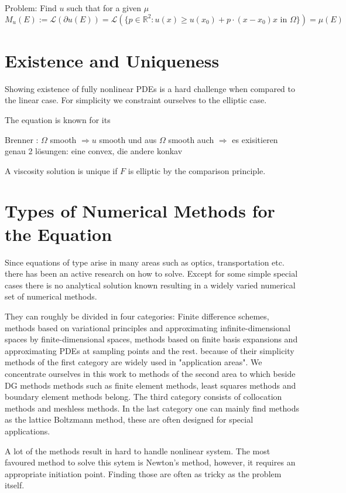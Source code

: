 Problem: Find $u$ such that for a given $\mu$
\[
M_u(E):=\mathcal{L}(\partial u(E))=\mathcal{L}(\{p \in \mathbb{R}^2 : u(x) \geq u(x_0)+p\cdot(x-x_0) x \text{ in } \Omega \}) = \mu(E)
\]


\section{Existence and Uniqueness}
Showing existence of fully nonlinear PDEs is a hard challenge when compared to the linear case. For simplicity we constraint ourselves to the elliptic case. 


The \MA equation is known for its 

Brenner\cite{Brenner2012} : $\Omega$ smooth $\Rightarrow u$ smooth \cite{Caffarelli1984} und aus $\Omega$ smooth auch $\Rightarrow$ es exisitieren genau 2 lösungen: eine convex, die andere konkav \cite{Courant1989}

A viscosity solution is unique if $F$ is elliptic by the comparison principle.


\section{Types of Numerical Methods for the \MA Equation}
Since equations of \MA type arise in many areas such as optics, transportation etc. there has been an active research on how to solve. Except for some simple special cases there is no analytical solution known resulting in a widely varied numerical set of numerical methods.

They can roughly be divided in four categories: Finite difference schemes, methods based on variational principles and approximating infinite-dimensional spaces by finite-dimensional spaces, methods based on finite basis expansions and approximating PDEs at sampling points and the rest.
because of their simplicity methods of the first category are widely used in "application areas". We concentrate ourselves in this work to methods of the second area to which beside DG methods methods such as finite element methods, least squares methods and boundary element methods belong.
The third category consists of collocation methods and meshless methods.
In the last category one can mainly find methods as the lattice Boltzmann method, these are often designed for special applications.

A lot of the methods result in hard to handle nonlinear system. The most favoured method to solve this sytem is Newton's method, however, it requires an appropriate initiation point. Finding those are often as tricky as the problem itself.
